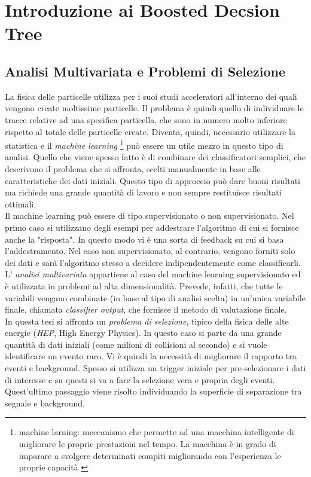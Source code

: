 \chapter{Introduzione ai Boosted Decsion Tree}

\section{Analisi Multivariata e Problemi di Selezione}
La fisica delle particelle utilizza per i suoi studi acceleratori all'interno dei quali vengono create moltissime particelle. Il problema è quindi quello di individuare le tracce relative ad una specifica particella, che sono in numero molto inferiore rispetto al totale delle particelle create. Diventa, quindi, necessario utilizzare la statistica e il \textit{machine learning} \footnote{machine larning: meccanismo che permette ad una macchina intelligente di migliorare le proprie prestazioni nel tempo. La macchina è in grado di imparare a svolgere determinati compiti migliorando con l'esperienza le proprie capacità \cite{sitoMachineLearning}} può essere un utile mezzo in questo tipo di analisi. Quello che viene spesso fatto è di combinare dei classificatori semplici, che descrivono il problema che si affronta, scelti manualmente in base alle caratteristiche dei dati iniziali. Questo tipo di approccio può dare buoni risultati ma richiede una grande quantità di lavoro e non sempre restituisce risultati ottimali.\cite{articoloDeepLearning} 
\\Il machine learning può essere di tipo supervisionato o non supervisionato. Nel primo caso si utilizzano degli esempi per addestrare l'algoritmo di cui si fornisce anche la "risposta". In questo modo vi è una sorta di feedback su cui si basa l'addestramento. Nel caso non supervisionato, al contrario, vengono forniti solo dei dati e sarà l'algoritmo stesso a decidere indipendentemente come classificarli. L' \textit{analisi multivariata}  appartiene al caso del machine learning supervisionato ed è utilizzata in problemi ad alta dimensionalità. Prevede, infatti, che tutte le variabili vengano combinate (in base al tipo di analisi scelta) in un'unica variabile finale, chiamata \textit{classifier output}, che fornisce il metodo di valutazione finale.
\\In questa tesi si affronta un \textit{problema di selezione}, tipico della fisica delle alte energie (\textit{HEP}, High Energy Physics). In questo caso si parte da una grande quantità di dati iniziali (come milioni di collisioni al secondo) e si vuole identificare un evento raro. Vi è quindi la necessità di migliorare il rapporto tra eventi e background. Spesso si utilizza un trigger iniziale per pre-selezionare i dati di interesse e su questi si va a fare la selezione vera e propria degli eventi. Quest'ultimo passaggio viene risolto individuando la superficie di separazione tra segnale e background. 


